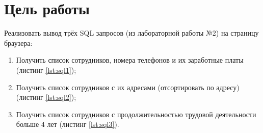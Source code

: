 \chapter{Цель работы}

Реализовать вывод трёх SQL запросов (из лабораторной работы №2) на страницу браузера:
\begin{enumerate}
    \item Получить список сотрудников, номера телефонов и их заработные платы (листинг \ref{lst:sql1});
    \item Получить список сотрудников с их адресами (отсортировать по адресу) (листинг \ref{lst:sql2});
    \item Получить список сотрудников с продолжительностью трудовой деятельности больше 4 лет (листинг \ref{lst:sql3}).
\end{enumerate}

\begin{listing}[H]
    \caption{SQL запрос для получения списка сотрудников, их номеров телефонов и их заработные платы}
    \label{lst:sql1}
\end{listing}

\begin{listing}[H]
    \caption{SQL запрос для получения списка сотрудников с их адресами}
    \label{lst:sql2}
\end{listing}

\begin{listing}[H]
    \caption{SQL запрос для получения списка сотрудников, чья трудовая деятельность больше 4 лет}
    \label{lst:sql3}
\end{listing}
